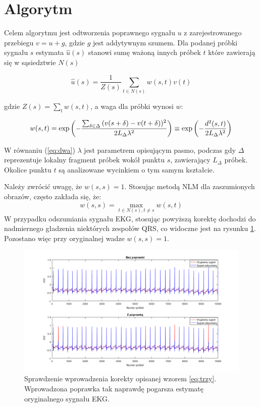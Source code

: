 \section{Algorytm}
\label{ch:algorytm}
Celem algorytmu jest odtworzenia poprawnego sygnału $u$ z zarejestrowanego przebiegu $v = u + g$, gdzie $g$ jest addytywnym szumem. Dla podanej próbki sygnału $s$ estymata  $\hat{u}\left ( s \right )$ stanowi sumę ważoną innych próbek $t$ które zawierają się w sąsiedztwie $N(s)$ 


\begin{equation}
\label{eq:jeden}
\hat{u}\left(s\right)= \frac{1}{Z(s)} \sum_{t\in N(s)} w(s,t)v(t)
\end{equation}

gdzie $Z(s) = \sum_{t} w(s,t)$, a waga dla próbki wynosi $w$:

\begin{equation}
\label{eq:dwa}
w(s,t)= \textup{exp} \left (  -\frac{\sum_{\delta \in \Delta }{(v(s+\delta)-v(t+\delta))^{2}}}{2L_{\Delta}\lambda^{2}}\right ) \equiv \textup{exp} \left ( -\frac{d^{2}(s,t)}{2L_{\Delta}\lambda^{2}}\right )
\end{equation}

W równaniu (\ref{eq:dwa}) $\lambda$ jest parametrem opisującym pasmo, podczas gdy $\Delta$ reprezentuje lokalny fragment próbek wokół punktu $s$, zawierający $L_{\Delta}$ próbek. Okolice punktu $t$ są analizowane wycinkiem o tym samym kształcie.

Należy zwrócić uwagę, że $w(s,s)=1$. Stosując metodą NLM dla zaszumionych obrazów, często zakłada się, że:
\begin{equation}
\label{eq:trzy}
w(s,s) = \max_{t\in N(s),t\neq s}w(s,t)
\end{equation}
W przypadku odszumiania sygnału EKG, stosując powyższą korektę dochodzi do nadmiernego gładzenia niektórych zespołów QRS, co widoczne jest na rysunku \ref{rys:rzekomapoprawa}. Pozostano więc przy oryginalnej wadze  $w(s,s)=1$.
\begin{figure}[!htb]
	\begin{center}
		\includegraphics[width=15cm,clip]
		{img/rzekomapoprawa.png}
	\end{center}
	\caption{Sprawdzenie wprowadzenia korekty opisanej wzorem \ref{eq:trzy}. Wprowadzona poprawka tak naprawdę pogarsza estymatę oryginalnego sygnału EKG.}
	\label{rys:rzekomapoprawa}
\end{figure}

